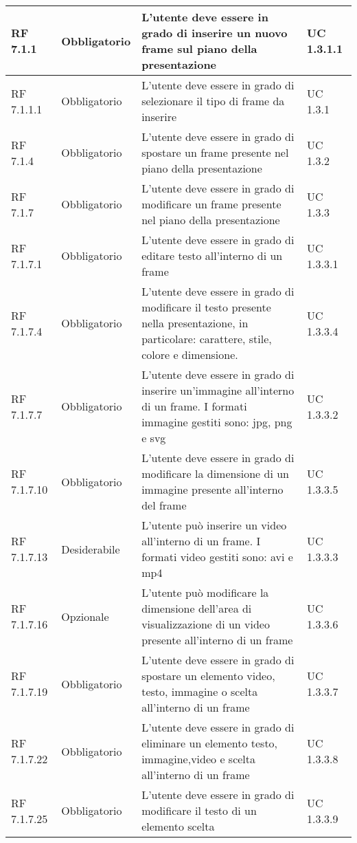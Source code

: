 {\begin{longtable} [c]{| p{2.5cm} | p{2.5cm} | p{6cm} |p{2.5cm}|}
		\hline
		RF 7.1.1 & Obbligatorio & L'utente deve essere in grado di inserire un nuovo frame\ped{g} sul piano della presentazione\ped{g} & UC 1.3.1.1\\
		\hline
		RF 7.1.1.1 & Obbligatorio & L'utente deve essere in grado di selezionare il tipo di frame\ped{g} da inserire & UC 1.3.1\\
		\hline
		RF 7.1.4 & Obbligatorio & L'utente deve essere in grado di spostare un frame\ped{g} presente nel piano della presentazione\ped{g} & UC 1.3.2\\
		\hline
		RF 7.1.7 & Obbligatorio & L'utente deve essere in grado di modificare un frame\ped{g} presente nel piano della presentazione\ped{g} & UC 1.3.3\\
		\hline
		RF 7.1.7.1 & Obbligatorio & L'utente deve essere in grado di editare testo all'interno di un frame\ped{g} & UC 1.3.3.1\\
		\hline
		RF 7.1.7.4 & Obbligatorio & L'utente deve essere in grado di modificare il testo presente nella presentazione, in particolare: carattere, stile, colore e dimensione. & UC 1.3.3.4\\
		\hline
		RF 7.1.7.7 & Obbligatorio & L'utente deve essere in grado di inserire un'immagine all'interno di un frame\ped{g}. I formati immagine gestiti sono: jpg, png e svg & UC 1.3.3.2\\
		\hline
		RF 7.1.7.10 & Obbligatorio & L'utente deve essere in grado di modificare la dimensione di un immagine presente all'interno del frame\ped{g} & UC 1.3.3.5\\
		\hline
		RF 7.1.7.13 & Desiderabile & L'utente può inserire un video all'interno di un frame\ped{g}. I formati video gestiti sono: avi e mp4 & UC 1.3.3.3\\
		\hline
		RF 7.1.7.16 & Opzionale & L'utente può modificare la dimensione dell’area di visualizzazione di un video presente all'interno di un frame\ped{g}  & UC 1.3.3.6\\
		\hline
		RF 7.1.7.19 & Obbligatorio & L'utente deve essere in grado di spostare un elemento video, testo, immagine o scelta all'interno di un frame\ped{g} & UC 1.3.3.7\\
		\hline
		RF 7.1.7.22 & Obbligatorio & L'utente deve essere in grado di eliminare un elemento testo, immagine,video e scelta all'interno di un frame\ped{g} & UC 1.3.3.8\\
		\hline
		RF 7.1.7.25 & Obbligatorio & L'utente deve essere in grado di modificare il testo di un elemento scelta\ped{g} & UC 1.3.3.9\\

\end{longtable}}
